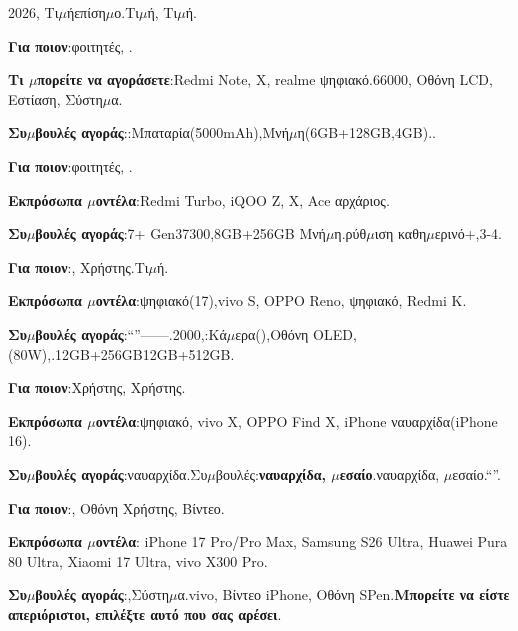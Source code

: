 
2026, Τι$\mu$ήεπίση$\mu$ο.Τι$\mu$ή, Τι$\mu$ή.


\textbf{Για ποιον}:φοιτητές, .

\textbf{Τι $\mu$πορείτε να αγοράσετε}:Redmi Note, X, realme ψηφιακό.66000, Οθόνη LCD, Εστίαση, Σύστη$\mu$α.

\textbf{Συ$\mu$βουλές αγοράς}::Μπαταρία(5000mAh),Μνή$\mu$η(6GB+128GB,4GB)..


\textbf{Για ποιον}:φοιτητές, .

\textbf{Εκπρόσωπα $\mu$οντέλα}:Redmi Turbo, iQOO Z, X, Ace αρχάριος.

\textbf{Συ$\mu$βουλές αγοράς}:7+ Gen37300,8GB+256GB Μνή$\mu$η.ρύθ$\mu$ιση καθη$\mu$ερινό+,3-4.


\textbf{Για ποιον}:, Χρήστης.Τι$\mu$ή.

\textbf{Εκπρόσωπα $\mu$οντέλα}:ψηφιακό(17),vivo S, OPPO Reno, ψηφιακό, Redmi K.

\textbf{Συ$\mu$βουλές αγοράς}:“”——.2000,:Κά$\mu$ερα(),Οθόνη OLED,(80W),.12GB+256GB12GB+512GB.


\textbf{Για ποιον}:Χρήστης, Χρήστης.

\textbf{Εκπρόσωπα $\mu$οντέλα}:ψηφιακό, vivo X, OPPO Find X, iPhone ναυαρχίδα(iPhone 16).

\textbf{Συ$\mu$βουλές αγοράς}:ναυαρχίδα.Συ$\mu$βουλές:\textbf{ναυαρχίδα, $\mu$εσαίο}.ναυαρχίδα, $\mu$εσαίο.“”.


\textbf{Για ποιον}:, Οθόνη Χρήστης, Βίντεο.

\textbf{Εκπρόσωπα $\mu$οντέλα}: iPhone 17 Pro/Pro Max, Samsung S26 Ultra, Huawei Pura 80 Ultra, Xiaomi 17 Ultra, vivo X300 Pro.

\textbf{Συ$\mu$βουλές αγοράς}:,Σύστη$\mu$α.vivo, Βίντεο iPhone, Οθόνη SPen.\textbf{Μπορείτε να είστε απεριόριστοι, επιλέξτε αυτό που σας αρέσει}.

